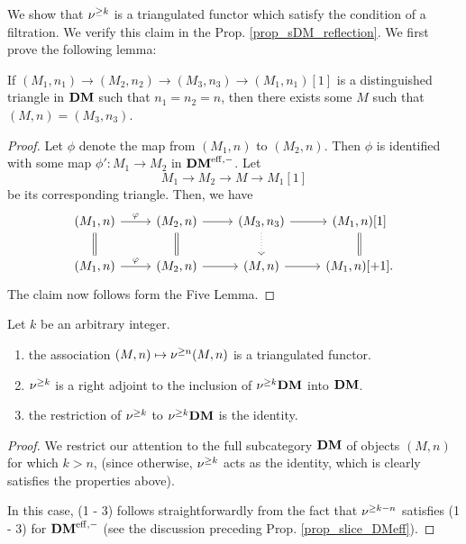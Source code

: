 We show that $\nu^{\geq k}$ is a triangulated functor which satisfy 
the condition of a filtration. We verify this claim in the 
Prop. \ref{prop_sDM_reflection}. We first prove the following
lemma:

\begin{lem}\label{lem_triangle_in_DM}
If $(M_1, n_1) \to (M_2, n_2) \to (M_3, n_3) \to (M_1, n_1)[1]$
is a distinguished triangle in $\mathbf{DM}$ such that $n_1 = n_2 = n$, 
then there exists some $M$ such that $(M, n) = (M_3, n_3)$.
\end{lem}
\begin{proof}
Let $\phi$ denote the map from $(M_1, n)$ to $(M_2, n)$. Then
$\phi$ is identified with some map $\phi': M_1 \to M_2$ in 
$\mathbf{DM}^{\mathrm{eff},-}$. Let
\[
M_1 \to M_2 \to M \to M_1[1]
\]
be its corresponding triangle. Then, we have
\[
\begin{tikzcd}
(M_1, n) \arrow{r}{\phi} \arrow[equals]{d} &
(M_2, n) \arrow{r} \arrow[equals]{d} &
(M_3, n_3) \arrow{r} \arrow[dotted]{d} &
(M_1, n)[1] \arrow[equals]{d}\\
(M_1, n) \arrow{r}{\phi} &
(M_2, n) \arrow{r} &
(M, n) \arrow{r} &
(M_1, n)[+1].
\end{tikzcd}
\]
The claim now follows form the Five Lemma.
\end{proof}

\begin{prop}\label{prop_sDM_reflection}
Let $k$ be an arbitrary integer.

\begin{enumerate}
\item the association $(M, n) \mapsto \nu^{\geq n} (M, n)$ is 
a triangulated functor.

\item $\nu^{\geq k}$ is a right adjoint to the inclusion of 
$\nu^{\geq k}\mathbf{DM}$ into $\mathbf{DM}$.

\item the restriction of $\nu^{\geq k}$ to $\nu^{\geq k} \mathbf{DM}$ is the 
identity.
\end{enumerate}
\end{prop}
\begin{proof}
We restrict our attention to the full subcategory $\mathbf{DM}$ of objects 
$(M, n)$ for which $k > n$, (since otherwise, $\nu^{\geq k}$ acts as 
the identity, which is clearly satisfies the properties above).

In this case, (1 - 3) follows straightforwardly from the fact that
$\nu^{\geq k - n}$ satisfies (1 - 3) for $\mathbf{DM}^{\mathrm{eff},-}$ (see the discussion
preceding Prop. \ref{prop_slice_DMeff}).
\end{proof}

